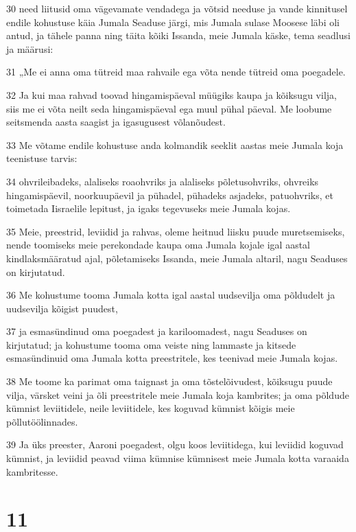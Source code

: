 \par 30 need liitusid oma vägevamate vendadega ja võtsid needuse ja vande kinnitusel endile kohustuse käia Jumala Seaduse järgi, mis Jumala sulase Moosese läbi oli antud, ja tähele panna ning täita kõiki Issanda, meie Jumala käske, tema seadlusi ja määrusi:
\par 31 „Me ei anna oma tütreid maa rahvaile ega võta nende tütreid oma poegadele.
\par 32 Ja kui maa rahvad toovad hingamispäeval müügiks kaupa ja kõiksugu vilja, siis me ei võta neilt seda hingamispäeval ega muul pühal päeval. Me loobume seitsmenda aasta saagist ja igasugusest võlanõudest.
\par 33 Me võtame endile kohustuse anda kolmandik seeklit aastas meie Jumala koja teenistuse tarvis:
\par 34 ohvrileibadeks, alaliseks roaohvriks ja alaliseks põletusohvriks, ohvreiks hingamispäevil, noorkuupäevil ja pühadel, pühadeks asjadeks, patuohvriks, et toimetada Iisraelile lepitust, ja igaks tegevuseks meie Jumala kojas.
\par 35 Meie, preestrid, leviidid ja rahvas, oleme heitnud liisku puude muretsemiseks, nende toomiseks meie perekondade kaupa oma Jumala kojale igal aastal kindlaksmääratud ajal, põletamiseks Issanda, meie Jumala altaril, nagu Seaduses on kirjutatud.
\par 36 Me kohustume tooma Jumala kotta igal aastal uudsevilja oma põldudelt ja uudsevilja kõigist puudest,
\par 37 ja esmasündinud oma poegadest ja kariloomadest, nagu Seaduses on kirjutatud; ja kohustume tooma oma veiste ning lammaste ja kitsede esmasündinuid oma Jumala kotta preestritele, kes teenivad meie Jumala kojas.
\par 38 Me toome ka parimat oma taignast ja oma tõstelõivudest, kõiksugu puude vilja, värsket veini ja õli preestritele meie Jumala koja kambrites; ja oma põldude kümnist leviitidele, neile leviitidele, kes koguvad kümnist kõigis meie põllutöölinnades.
\par 39 Ja üks preester, Aaroni poegadest, olgu koos leviitidega, kui leviidid koguvad kümnist, ja leviidid peavad viima kümnise kümnisest meie Jumala kotta varaaida kambritesse.

\chapter{11}

